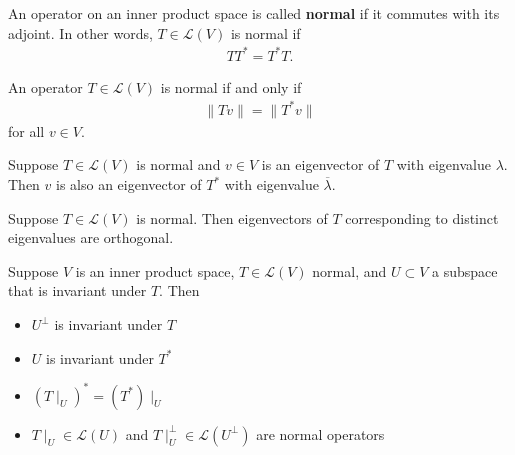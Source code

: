 \documentclass{memoir}
\begin{document}
\begin{defn}[Normal]
	An operator on an inner product space is called \textbf{normal} if it commutes with its adjoint. In other words, \(T \in \mathcal{L}(V)\) is normal if
	\begin{align*}
		 TT^{*} = T^{*}T.
	\end{align*}
\end{defn}
\begin{prop}
	An operator \(T \in \mathcal{L}(V)\) is normal if and only if
	\begin{align*}
		 \|Tv\| = \|T^{*}v\|
	\end{align*}
	for all \(v \in V\).
\end{prop}
\begin{cor}
	Suppose \(T \in \mathcal{L}(V)\) is normal and \(v \in V\) is an eigenvector of \(T\) with eigenvalue \(\lambda\). Then \(v\) is also an eigenvector of \(T^{*}\) with eigenvalue \(\overline{\lambda}\).
\end{cor}
\begin{cor}
	Suppose \(T \in \mathcal{L}(V)\) is normal. Then eigenvectors of \(T\) corresponding to distinct eigenvalues are orthogonal.
\end{cor}

\begin{prop}
	Suppose \(V\) is an inner product space, \(T \in \mathcal{L}(V)\) normal, and \(U\subset V\) a subspace that is invariant under \(T\). Then
	\begin{itemize}
		\item \(U^{\perp}\) is invariant under \(T\) 
		\item \(U\) is invariant under \(T^{*}\) 
		\item \((T\mid_U)^{*} = (T^{*})\mid_U\) 
		\item \(T\mid_U \in \mathcal{L}(U)\) and \(T\mid_U^{\perp} \in \mathcal{L}(U^{\perp})\) are normal operators
	\end{itemize}
\end{prop}
\end{document}
